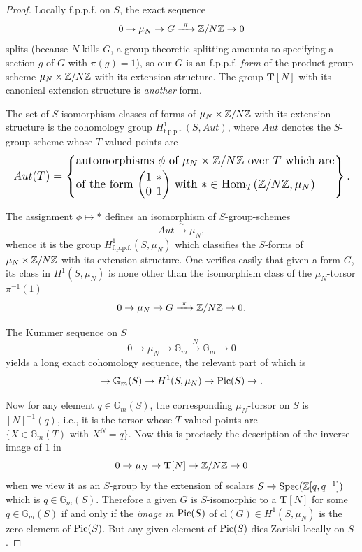 \begin{proof}
Locally f.p.p.f. on $S$, the exact sequence
\[
0 \to \mu_N \to G \xrightarrow{\ \pi\ } \mathbb{Z}/N\mathbb{Z} \to 0
\]
splits (because $N$ kills $G$, a group-theoretic splitting amounts to specifying a section $g$ of $G$ with $\pi(g) = 1$), so our $G$ is an f.p.p.f. \emph{form} of the product group-scheme $\mu_N \times \mathbb{Z}/N\mathbb{Z}$ with its extension structure. The group $\mathbf{T}[N]$ with its canonical extension structure is \emph{another} form.

The set of $S$-isomorphism classes of forms of $\mu_N \times \mathbb{Z}/N\mathbb{Z}$ with its extension structure is the cohomology group $H^1_{\text{f.p.p.f.}}(S, \mathit{Aut})$, where $\mathit{Aut}$ denotes the $S$-group-scheme whose $T$-valued points are
\[
\resizebox{\linewidth}{!}{$\displaystyle
\mathit{Aut}(T) = \left\{
\begin{array}{@{}l@{}}
\text{automorphisms } \phi \text{ of } \mu_N \times \Z/N\Z \text{ over } T \text{ which are}\\[2pt]
\text{of the form } {\setlength{\arraycolsep}{2pt}\begin{pmatrix} 1 & * \\ 0 & 1 \end{pmatrix}} \text{ with } * \in \Hom_T(\Z/N\Z, \mu_N)
\end{array}
\right\} .
$}
\]

The assignment $\phi \mapsto *$ defines an isomorphism of $S$-group-schemes
\[
\mathit{Aut} \xrightarrow{\ \sim\ } \mu_N ,
\]
whence it is the group $H^1_{\text{f.p.p.f.}}(S, \mu_N)$ which classifies the $S$-forms of $\mu_N \times \mathbb{Z}/N\mathbb{Z}$ with its extension structure. One verifies easily that given a form $G$, its class in $H^1(S, \mu_N)$ is none other than the isomorphism class of the $\mu_N$-torsor $\pi^{-1}(1)$
\[
0 \to \mu_N \to G \xrightarrow{\ \pi\ } \mathbb{Z}/N\mathbb{Z} \to 0 .
\]

The Kummer sequence on $S$
\[
0 \to \mu_N \to \mathbb{G}_m \xrightarrow{\ N\ } \mathbb{G}_m \to 0
\]
yields a long exact cohomology sequence, the relevant part of which is
\[
\to \mathbb{G}_m(S) \to H^1(S, \mu_N) \to \operatorname{Pic}(S) \to .
\]

Now for any element $q \in \mathbb{G}_m(S)$, the corresponding $\mu_N$-torsor on $S$ is $[N]^{-1}(q)$, i.e., it is the torsor whose $T$-valued points are $\{X \in \mathbb{G}_m(T) \text{ with } X^N = q\}$. Now this is precisely the description of the inverse image of $1$ in
\[
0 \to \mu_N \to \mathbf{T}[N] \to \mathbb{Z}/N\mathbb{Z} \to 0
\]
when we view it as an $S$-group by the extension of scalars $S \to \operatorname{Spec}(\mathbb{Z}[q,q^{-1}])$ which is $q \in \mathbb{G}_m(S)$. Therefore a given $G$ is $S$-isomorphic to a $\mathbf{T}[N]$ for some $q \in \mathbb{G}_m(S)$ if and only if the \emph{image in} $\operatorname{Pic}(S)$ of $\mathrm{cl}(G) \in H^1(S, \mu_N)$ is the zero-element of $\operatorname{Pic}(S)$. But any given element of $\operatorname{Pic}(S)$ dies Zariski locally on $S$.
\end{proof}

